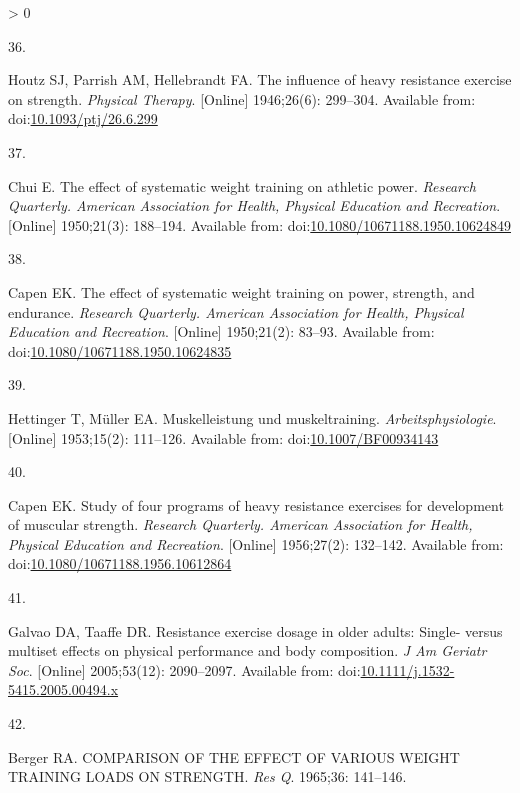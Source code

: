 \documentclass[twoside,10pt]{gihclass} %
\newlength{\cslhangindent}
\newlength{\csllabelwidth}
\newenvironment{CSLReferences}[3] %
 {%
  \setlength{\parindent}{0pt}
  \ifodd #1 \everypar{\setlength{\hangindent}{\cslhangindent}}\ignorespaces\fi
  \ifnum #2 > 0
  \setlength{\parskip}{#2\baselineskip}
  \fi
 }%
 {}
\newcommand{\CSLLeftMargin}[1]{\parbox[t]{\maxof{\widthof{#1}}{\csllabelwidth}}{#1}}
\newcommand{\CSLRightInline}[1]{\parbox[t]{\linewidth}{#1}}
\begin{document}
\begin{CSLReferences}{0}{0}
\leavevmode\hypertarget{ref-RN2632}{}%
\CSLLeftMargin{36. }
\CSLRightInline{Houtz SJ, Parrish AM, Hellebrandt FA. The influence of heavy resistance exercise on strength. \emph{Physical Therapy}. {[}Online{]} 1946;26(6): 299--304. Available from: doi:\href{https://doi.org/10.1093/ptj/26.6.299}{10.1093/ptj/26.6.299}}

\leavevmode\hypertarget{ref-RN2644}{}%
\CSLLeftMargin{37. }
\CSLRightInline{Chui E. The effect of systematic weight training on athletic power. \emph{Research Quarterly. American Association for Health, Physical Education and Recreation}. {[}Online{]} 1950;21(3): 188--194. Available from: doi:\href{https://doi.org/10.1080/10671188.1950.10624849}{10.1080/10671188.1950.10624849}}

\leavevmode\hypertarget{ref-RN2642}{}%
\CSLLeftMargin{38. }
\CSLRightInline{Capen EK. The effect of systematic weight training on power, strength, and endurance. \emph{Research Quarterly. American Association for Health, Physical Education and Recreation}. {[}Online{]} 1950;21(2): 83--93. Available from: doi:\href{https://doi.org/10.1080/10671188.1950.10624835}{10.1080/10671188.1950.10624835}}

\leavevmode\hypertarget{ref-RN2645}{}%
\CSLLeftMargin{39. }
\CSLRightInline{Hettinger T, Müller EA. Muskelleistung und muskeltraining. \emph{Arbeitsphysiologie}. {[}Online{]} 1953;15(2): 111--126. Available from: doi:\href{https://doi.org/10.1007/BF00934143}{10.1007/BF00934143}}

\leavevmode\hypertarget{ref-RN1477}{}%
\CSLLeftMargin{40. }
\CSLRightInline{Capen EK. Study of four programs of heavy resistance exercises for development of muscular strength. \emph{Research Quarterly. American Association for Health, Physical Education and Recreation}. {[}Online{]} 1956;27(2): 132--142. Available from: doi:\href{https://doi.org/10.1080/10671188.1956.10612864}{10.1080/10671188.1956.10612864}}

\leavevmode\hypertarget{ref-RN1472}{}%
\CSLLeftMargin{41. }
\CSLRightInline{Galvao DA, Taaffe DR. Resistance exercise dosage in older adults: Single- versus multiset effects on physical performance and body composition. \emph{J Am Geriatr Soc}. {[}Online{]} 2005;53(12): 2090--2097. Available from: doi:\href{https://doi.org/10.1111/j.1532-5415.2005.00494.x}{10.1111/j.1532-5415.2005.00494.x}}

\leavevmode\hypertarget{ref-RN2659}{}%
\CSLLeftMargin{42. }
\CSLRightInline{Berger RA. COMPARISON OF THE EFFECT OF VARIOUS WEIGHT TRAINING LOADS ON STRENGTH. \emph{Res Q}. 1965;36: 141--146. }


\end{CSLReferences}
\end{document}
